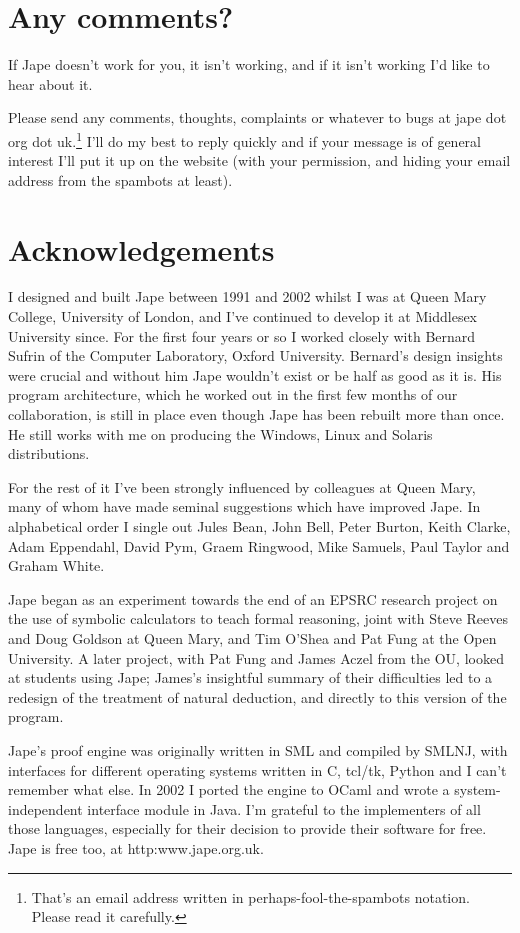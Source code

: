 \documentclass[11pt]{book}
\begin{document}
\section*{Any comments?}

If Jape doesn't work for you, it isn't working, and if it isn't working I'd like to hear about it. 

Please send any comments, thoughts, complaints or whatever to bugs at jape dot org dot uk.\footnote{That's an email address written in perhaps-fool-the-spambots notation. Please read it carefully.} I'll do my best to reply quickly and if your message is of general interest I'll put it up on the website (with your permission, and hiding your email address from the spambots at least). 

\section*{Acknowledgements}

I designed and built Jape between 1991 and 2002 whilst I was at Queen Mary College, University of London, and I've continued to develop it at Middlesex University since. For the first four years or so I worked closely with Bernard Sufrin of the Computer Laboratory, Oxford University. Bernard's design insights were crucial and without him Jape wouldn't exist or be half as good as it is. His program architecture, which he worked out in the first few months of our collaboration, is still in place even though Jape has been rebuilt more than once. He still works with me on producing the Windows, Linux and Solaris distributions.

For the rest of it I've been strongly influenced by colleagues at Queen Mary, many of whom have made seminal suggestions which have improved Jape. In alphabetical order I single out Jules Bean, John Bell, Peter Burton, Keith Clarke, Adam Eppendahl, David Pym, Graem Ringwood, Mike Samuels, Paul Taylor and Graham White. 

Jape began as an experiment towards the end of an EPSRC research project on the use of symbolic calculators to teach formal reasoning, joint with Steve Reeves and Doug Goldson at Queen Mary, and Tim O'Shea and Pat Fung at the Open University. A later project, with Pat Fung and James Aczel from the OU, looked at students using Jape; James's insightful summary of their difficulties led to a redesign of the treatment of natural deduction, and directly to this version of the program.

Jape's proof engine was originally written in SML and compiled by SMLNJ, with interfaces for different operating systems written in C, tcl/tk, Python and I can't remember what else. In 2002 I ported the engine to OCaml and wrote a system-independent interface module in Java. I'm grateful to the implementers of all those languages, especially for their decision to provide their software for free. Jape is free too, at http:www.jape.org.uk. 
\end{document}
